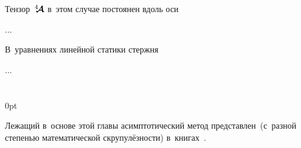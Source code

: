 

\begin{otherlanguage}{russian}

Тензор~${\hspace{.08ex}{^4\hspace{-0.7ex}\bm{\mathcal{A}}}\hspace{.08ex}}$ в~этом случае постоянен вдоль оси

...



\end{otherlanguage}



\begin{otherlanguage}{russian}

В~уравнениях линейной статики стержня

...




\end{otherlanguage}

\section*{\small \wordforbibliography}

\begin{changemargin}{\parindent}{0pt}
\fontsize{10}{12}\selectfont

\begin{otherlanguage}{russian}

Лежащий в~основе этой главы асимптотический метод представлен~(с~разной степенью математической скрупулёзности) в~книгах~\cite{bakhvalov.panasenko, asymptoticanalysisforperiodicstructures, kravchuk.mayboroda.urzhumtsev-polymericandcompositematerials, pobedrya-composites}.

\end{otherlanguage}

\end{changemargin}
